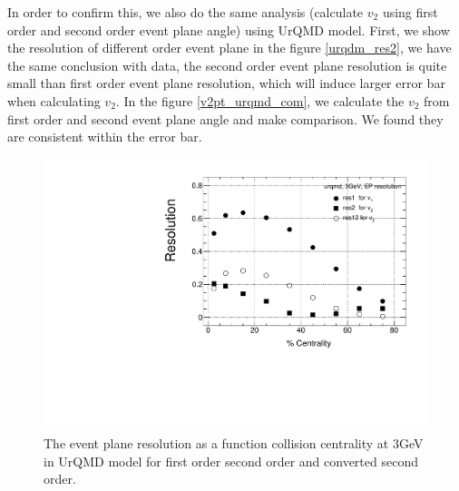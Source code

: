 In order to confirm this, we also do the same analysis (calculate $v_{2}$ using first order and second order event plane angle) using UrQMD model. First, we show the resolution of different order event plane in the figure \ref{urqdm_res2}, we have the same conclusion with data, the second order event plane resolution is quite small than first order event plane resolution, which will induce larger error bar when calculating $v_{2}$. In the figure \ref{v2pt_urqmd_com}, we calculate the $v_{2}$ from first order and second event plane angle and make comparison. 
We found they are consistent within the error bar.

\begin{figure}[h]
\includegraphics[scale=0.6]{chapter3/fig/second/res_urqmd.pdf}
\caption{\label{urqmd_res2} The event plane resolution as a function collision centrality at 3GeV in UrQMD model for first order second order and converted second order.}
\end{figure}

